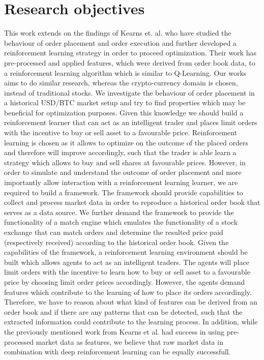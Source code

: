 \section{Research objectives}

This work extends on the findings of Kearns et. al. \cite{nevmyvaka2006reinforcement} who have studied the behaviour of order placement and order execution and further developed a reinforcement learning strategy in order to proceed optimization.
Their work has pre-processed and applied features, which were derived from order book data, to a reinforcement learning algorithm which is similar to Q-Learning.
Our works aims to do similar research, whereas the crypto-currency domain is chosen, instead of traditional stocks.
We investigate the behaviour of order placement in a historical USD/BTC market setup and try to find properties which may be beneficial for optimization purposes.
Given this knowledge we should build a reinforcement learner that can act as an intelligent trader and places limit orders with the incentive to buy or sell asset to a favourable price.
Reinforcement learning is chosen as it allows to optimize on the outcome of the placed orders and therefore will improve accordingly, such that the trader is able learn a strategy which allows to buy and sell shares at favourable prices.
However, in order to simulate and understand the outcome of order placement and more importantly allow interaction with a reinforcement learning learner, we are required to build a framework.
The framework should provide capabilities to collect and process market data in order to reproduce a historical order book that serves as a data source.
We further demand the framework to provide the functionality of a match engine which emulates the functionality of a stock exchange that can match orders and determine the resulted price paid (respectively received) according to the historical order book.
Given the capabilities of the framework, a reinforcement learning environment should be built which allows agents to act as an intelligent traders.
The agents will place limit orders with the incentive to learn how to buy or sell asset to a favourable price by choosing limit order prices accordingly.
However, the agents demand features which contribute to the learning of how to place its orders accordingly.
Therefore, we have to reason about what kind of features can be derived from an order book and if there are any patterns that can be detected, such that the extracted information could contribute to the learning process.
In addition, while the previously mentioned work from Kearns et al. had success in using pre-processed market data as features, we believe that raw market data in combination with deep reinforcement learning can be equally successfull.

